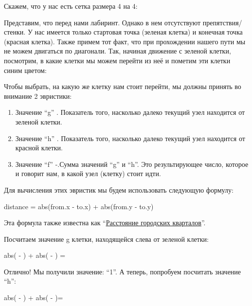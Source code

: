 Скажем, что у нас есть сетка размера 4 на 4:
\newpage


Представим, что перед нами лабиринт. Однако в нем отсутствуют препятствия/стенки. У нас имеется только стартовая точка (зеленая клетка) и конечная точка (красная клетка). Также примем тот факт, что при прохождении нашего пути мы не можем двигаться по диагонали. Так, начиная движение с зеленой клетки, посмотрим, в какие клетки мы можем перейти из неё и пометим эти клетки синим цветом:

\newpage


Чтобы выбрать, на какую же клетку нам стоит перейти, мы должны принять во внимание 2 эвристики:
\begin{enumerate} 
 \item Значение “g” . Показатель того, насколько далеко текущий узел находится от зеленой клетки.
 \item Значение “h” . Показатель того, насколько далеко текущий узел находится от красной клетки.
 \item Значение “f” -.Сумма значений “g” и “h”. Это результирующее число, которое и говорит нам, в какой узел (клетку) стоит идти.
\end{enumerate}
Для вычисления этих эвристик мы будем использовать следующую формулу: 

\begin{tcolorbox}
distance = abs(from.x - to.x) + abs(from.y - to.y) 
\end{tcolorbox}
\vspace{\baselineskip}

Эта формула также известна как “\href{https://vk.cc/44BmEO}{\underline{Расстояние городских кварталов}}”.

\vspace{\baselineskip}

Посчитаем значение g клетки, находящейся слева от зеленой клетки:

\begin{tcolorbox}
abs( - ) + abs( - ) = 
\end{tcolorbox}
\vspace{\baselineskip}

Отлично! Мы получили значение: “1”. А теперь, попробуем посчитать значение “h”:

\begin{tcolorbox}
abs( - ) + abs( - )=
\end{tcolorbox}
\vspace{\baselineskip}

